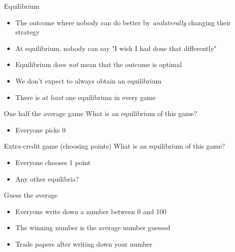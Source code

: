 \documentclass[10pt]{beamer}
\begin{document}
\begin{frame}[label={sec:org737c8b1}]{}
\alert{Equilibrium}
\begin{itemize}
\item The outcome where nobody can do better by \emph{unilaterally} changing their strategy
\item At equilibrium, nobody can say "I wish I had done that differently"
\item Equilibrium does \emph{not} mean that the outcome is optimal
\item We don't expect to always obtain an equilibrium
\item There is \emph{at least} one equilibrium in every game
\end{itemize}
\end{frame}

\begin{frame}[label={sec:org221de48}]{}
\alert{One half the average game}
What is an equilibrium of this game?
\begin{itemize}
\item Everyone picks 0
\end{itemize}
\end{frame}

\begin{frame}[label={sec:orgc68fd2a}]{}
\alert{Extra-credit game (choosing points)}
What is an equilibrium of this game?
\begin{itemize}
\item Everyone chooses 1 point
\item Any other equilibria?
\end{itemize}
\end{frame}

\begin{frame}[label={sec:org4c65cb1}]{}
\alert{Guess the average}
\begin{itemize}
\item Everyone write down a number between 0 and 100
\item The winning number is the average number guessed
\item Trade papers after writing down your number
\end{itemize}
\end{frame}
\end{document}
